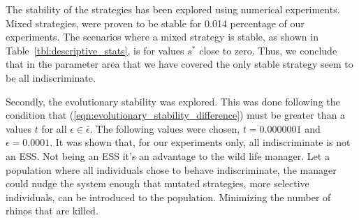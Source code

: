 \documentclass[10pt]{article}
\begin{document}
The stability of the strategies has been explored using numerical experiments. 
Mixed strategies, were proven to be stable for 0.014 percentage of our
experiments. The scenarios where a mixed strategy is stable, as shown in 
Table~\ref{tbl:descriptive_stats}, is for values \(s^*\)  close to zero. Thus, we
conclude that in the parameter area that we have covered the only stable
strategy seem to be all indiscriminate. 

Secondly, the evolutionary stability was explored. This was done following the condition that 
(\ref{eqn:evolutionary_stability_difference}) must be greater than a values \(t\) for all \(\epsilon
\in \bar{\epsilon}\). The following values were chosen, \(t=0.0000001\) and \(\epsilon=0.0001\). 
It was shown that, for our experiments only, all indiscriminate is not an ESS. Not being an ESS
it's an advantage to the wild life manager. Let a population where all individuals chose to behave
indiscriminate, the manager could nudge the system enough that mutated strategies, more
selective individuals, can be introduced to the population. Minimizing the number of rhinos
that are killed.



\end{document}
